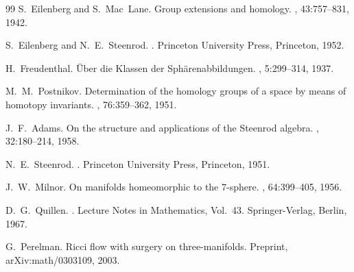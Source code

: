 \documentclass[12pt,a4paper]{article}
\begin{document}
\begin{thebibliography}{99}
S.~Eilenberg and S.~Mac~Lane.
\newblock Group extensions and homology.
, 43:757--831, 1942.

S.~Eilenberg and N.~E.~Steenrod.
.
\newblock Princeton University Press, Princeton, 1952.

H.~Freudenthal.
\newblock \"Uber die Klassen der Sph\"arenabbildungen.
, 5:299--314, 1937.

M.~M.~Postnikov.
\newblock Determination of the homology groups of a space by means of homotopy invariants.
, 76:359--362, 1951.

J.~F.~Adams.
\newblock On the structure and applications of the Steenrod algebra.
, 32:180--214, 1958.

N.~E.~Steenrod.
.
\newblock Princeton University Press, Princeton, 1951.

J.~W.~Milnor.
\newblock On manifolds homeomorphic to the $7$-sphere.
, 64:399--405, 1956.

D.~G.~Quillen.
.
\newblock Lecture Notes in Mathematics, Vol.~43. Springer-Verlag, Berlin, 1967.

G.~Perelman.
\newblock Ricci flow with surgery on three-manifolds.
\newblock Preprint, arXiv:math/0303109, 2003.

\end{thebibliography}
\end{document}
